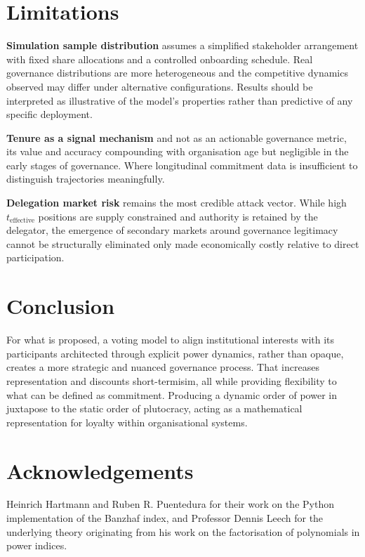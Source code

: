 \documentclass[a4paper,12pt]{article}
\begin{document}
\section{\signifier Limitations}

\noindent\textbf{Simulation sample distribution} assumes a simplified stakeholder arrangement with fixed share allocations and a controlled onboarding schedule. Real governance distributions are more heterogeneous and the competitive dynamics observed may differ under alternative configurations. Results should be interpreted as illustrative of the model's properties rather than predictive of any specific deployment. 
    
\noindent\textbf{Tenure as a signal mechanism} and not as an actionable governance metric, its value and accuracy compounding with organisation age but negligible in the early stages of governance. Where longitudinal commitment data is insufficient to distinguish trajectories meaningfully. 
    
\noindent\textbf{Delegation market risk} remains the most credible attack vector. While high $t_{\text{effective}}$ positions are supply constrained and authority is retained by the delegator, the emergence of secondary markets around governance legitimacy cannot be structurally eliminated only made economically costly relative to direct participation.

\section{\signifier Conclusion}

For what is proposed, a voting model to align institutional interests with its participants architected through explicit power dynamics, rather than opaque, creates a more strategic and nuanced governance process. That increases representation and discounts short-termisim, all while providing flexibility to what can be defined as commitment. Producing a dynamic order of power in juxtapose to the static order of plutocracy, acting as a mathematical representation for loyalty within organisational systems.

\section{\signifier Acknowledgements}

Heinrich Hartmann and Ruben R. Puentedura for their work on the Python implementation of the Banzhaf index, and Professor Dennis Leech for the underlying theory originating from his work on the factorisation of polynomials in power indices.



\end{document}
